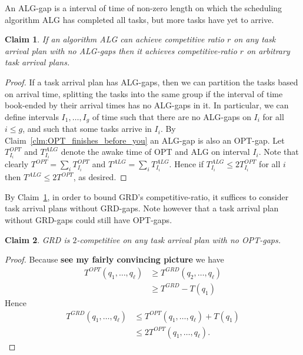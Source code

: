 \documentclass[twocolumn]{article}[10pt]
\newtheorem{clm}{Claim}
\begin{document}
An ALG-gap is a interval of time of non-zero length on which
the scheduling algorithm ALG has completed all tasks, but more
tasks have yet to arrive.
\begin{clm}
  \label{clm:just_consider_gapless}
  If an algorithm ALG can achieve competitive ratio $r$ on any
  task arrival plan with no ALG-gaps then it achieves
  competitive-ratio $r$ on arbitrary task arrival plans.
\end{clm}
\begin{proof}
  If a task arrival plan has ALG-gaps, then we can partition the
  tasks based on arrival time, splitting the tasks into the same
  group if the interval of time book-ended by their arrival times
  has no ALG-gaps in it. In particular, we can define intervals
  $I_1, \ldots, I_g$ of time such that there are no ALG-gaps on
  $I_i$ for all $i\le g$, and such that some tasks arrive in $I_i$.
  By Claim~\ref{clm:OPT_finishes_before_you} an ALG-gap is also an
  OPT-gap. 
  Let $T_{I_i}^{OPT}$ and $T_{I_i}^{ALG}$ denote the awake time
  of OPT and ALG on interval $I_i$. Note that clearly
  $T^{OPT} = \sum_{i} T_{I_i}^{OPT}$ and $T^{ALG} = \sum_{i}
  T_{I_i}^{ALG}$. Hence if $T_{I_i}^{ALG} \le 2T_{I_i}^{OPT}$ for
  all $i$ then $T^{ALG} \le 2T^{OPT}$, as desired.
  
\end{proof}

By Claim~\ref{clm:just_consider_gapless}, in order to bound GRD's
competitive-ratio, it suffices to consider task arrival plans
without GRD-gaps. Note however that a task arrival plan without
GRD-gaps could still have OPT-gaps.

\begin{clm}
  \label{clm:no_optgaps}
  GRD is $2$-competitive on any task arrival plan with no
  OPT-gaps.
\end{clm}
\begin{proof}
  Because \textbf{see my fairly convincing picture} we have
  \begin{align*}
    T^{OPT}(q_1, \ldots, q_{\ell}) &\ge T^{GRD}(q_2, \ldots, q_\ell) \\
  &\ge T^{GRD} - T(q_1)
  \end{align*}
  Hence
  \begin{align*}
    T^{GRD}(q_1, \ldots, q_\ell) &\le T^{OPT}(q_1, \ldots, q_\ell) + T(q_1) \\
                                   &\le 2T^{OPT}(q_1, \ldots, q_\ell).
  \end{align*}
\end{proof}
\end{document}
